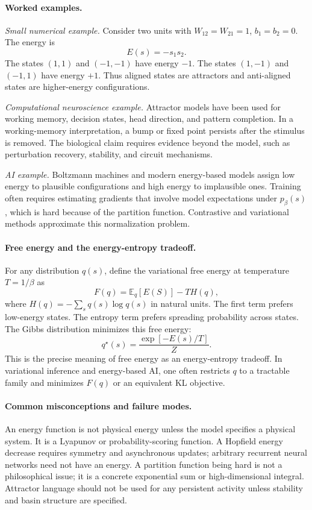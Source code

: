 \paragraph{Worked examples.}
\emph{Small numerical example.}
Consider two units with \(W_{12}=W_{21}=1\), \(b_1=b_2=0\). The energy is
\[
E(s)=-s_1s_2.
\]
The states \((1,1)\) and \((-1,-1)\) have energy \(-1\). The states \((1,-1)\) and \((-1,1)\) have energy \(+1\). Thus aligned states are attractors and anti-aligned states are higher-energy configurations.

\emph{Computational neuroscience example.}
Attractor models have been used for working memory, decision states, head direction, and pattern completion. In a working-memory interpretation, a bump or fixed point persists after the stimulus is removed. The biological claim requires evidence beyond the model, such as perturbation recovery, stability, and circuit mechanisms.

\emph{AI example.}
Boltzmann machines and modern energy-based models assign low energy to plausible configurations and high energy to implausible ones. Training often requires estimating gradients that involve model expectations under \(p_\beta(s)\), which is hard because of the partition function. Contrastive and variational methods approximate this normalization problem.

\paragraph{Free energy and the energy-entropy tradeoff.}
For any distribution \(q(s)\), define the variational free energy at temperature \(T=1/\beta\) as
\[
\boxed{
F(q)=\mathbb E_q[E(S)]-T H(q),
}
\]
where \(H(q)=-\sum_s q(s)\log q(s)\) in natural units. The first term prefers low-energy states. The entropy term prefers spreading probability across states. The Gibbs distribution minimizes this free energy:
\[
q^\star(s)=\frac{\exp[-E(s)/T]}{Z}.
\]
This is the precise meaning of free energy as an energy-entropy tradeoff. In variational inference and energy-based AI, one often restricts \(q\) to a tractable family and minimizes \(F(q)\) or an equivalent KL objective.

\paragraph{Common misconceptions and failure modes.}
An energy function is not physical energy unless the model specifies a physical system. It is a Lyapunov or probability-scoring function. A Hopfield energy decrease requires symmetry and asynchronous updates; arbitrary recurrent neural networks need not have an energy. A partition function being hard is not a philosophical issue; it is a concrete exponential sum or high-dimensional integral. Attractor language should not be used for any persistent activity unless stability and basin structure are specified.


